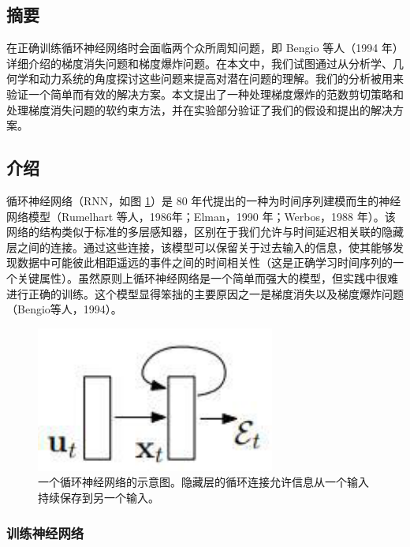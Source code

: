 \subsection{摘要}\label{ux6458ux8981}

在正确训练循环神经网络时会面临两个众所周知问题，即 Bengio 等人（1994 年）详细介绍的梯度消失问题和梯度爆炸问题。在本文中，我们试图通过从分析学、几何学和动力系统的角度探讨这些问题来提高对潜在问题的理解。我们的分析被用来验证一个简单而有效的解决方案。本文提出了一种处理梯度爆炸的范数剪切策略和处理梯度消失问题的软约束方法，并在实验部分验证了我们的假设和提出的解决方案。

\subsection{介绍}\label{1-ux4ecbux7ecd}

循环神经网络（RNN，如图 \ref{fig:rnn}）是 80 年代提出的一种为时间序列建模而生的神经网络模型（Rumelhart 等人，1986年；Elman，1990 年；Werbos，1988 年）。该网络的结构类似于标准的多层感知器，区别在于我们允许与时间延迟相关联的隐藏层之间的连接。通过这些连接，该模型可以保留关于过去输入的信息，使其能够发现数据中可能彼此相距遥远的事件之间的时间相关性（这是正确学习时间序列的一个关键属性）。虽然原则上循环神经网络是一个简单而强大的模型，但实践中很难进行正确的训练。这个模型显得笨拙的主要原因之一是梯度消失以及梯度爆炸问题（Bengio等人，1994）。

\begin{figure}[htbp]
  \centering
  \includegraphics[width=0.7\textwidth]{figures/image-20240305130953312.png}
  \caption{一个循环神经网络的示意图。隐藏层的循环连接允许信息从一个输入持续保存到另一个输入。}
  \label{fig:rnn}
\end{figure}

\subsubsection{训练神经网络}\label{11-ux8badux7ec3ux795eux7ecfux7f51ux7edc}

